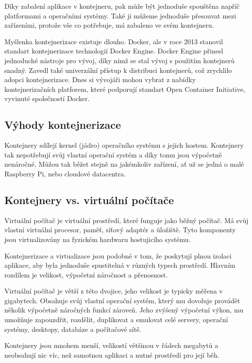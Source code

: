 \documentclass[czech,12pt,a4paper]{article}
\begin{document}
Díky zabalení aplikace v kontejneru, pak může být jednoduše spouštěna napříč platformami a operačními systémy. Také ji můžeme jednoduše přesouvat mezi zařízeními, protože vše co potřebuje, má zabaleno ve svém kontejneru.

Myšlenka kontejnerizace existuje dlouho. Docker, ale v roce 2013 stanovil standart kontejnerizace technologií Docker Engine. Docker Engine přinesl jednoduché nástroje pro vývoj, díky nimž se stal vývoj s použitím kontejnerů snadný. Zavedl také univerzální přístup k distribuci kontejnerů, což zrychlilo adopci kontejnerizace. Dnes si vývojáři mohou vybrat z nabídky kontejnerizačních platforem, které podporují standart Open Container Initiative, vyvinuté společností Docker.

\subsection{Výhody kontejnerizace}

Kontejnery sdílejí kernel (jádro) operačního systému s jejich hostem. Kontejnery tak nepotřebují svůj vlastní operační systém a díky tomu jsou výpočetně nenáročné. Můžou tak běžet stejně na jakémkoliv zařízení, ať už se jedná o malé Raspberry Pi, nebo cloudové datacentra.

\subsection{Kontejnery vs. virtuální počítače}

Virtuální počítač je virtuální prostředí, které funguje jako běžný počítač. Má svůj vlastní virtuální procesor, paměť, síťový adaptér a úložiště. Tyto komponenty jsou virtualizovány na fyzickém hardwaru hostujicího systému.

Kontejnerizace a virtualizace jsou podobné v tom, že poskytují plnou izolaci aplikace, aby byla jednoduše spustitelná v různých typech prostředí. Hlavním rozdílem je velikost, výpočetní náročnost a přenosnost.

Virtuální počítač je větší z této dvojice, jeho velikost je typicky měřena v gigabytech. Obsahuje svůj vlastní operační systém, který mu dovoluje provádět několik výpočetně náročných funkcí zároveň. Jeho zvýšený výpočetní výkon, mu umožňuje zapouzdřit, rozdělit, duplikovat a emulovat celé servery, operační systémy, desktopy, databáze a počítačové sítě.

Kontejnery jsou mnohem menší, velikostí většinou v řádech megabytů a neobsahují nic víc, než samotnou aplikaci a nutné prostředí pro její běh.
\end{document}
